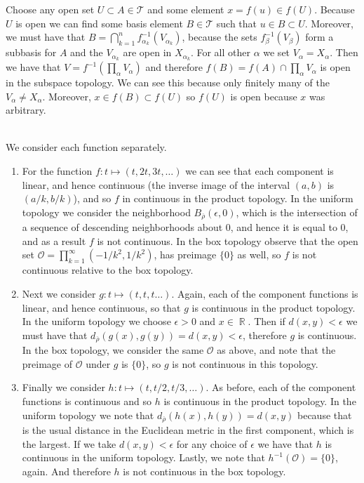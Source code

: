 \documentclass{article}
\DeclareMathOperator{\R}{\mathbb{R}}
\newcommand{\problem}[1]{\noindent{\textbf{Problem #1}}\\}
\newcommand{\problempart}[1]{\noindent{\textbf{(#1)}}}
\begin{document}
\problempart{d} Choose any open set $U \subset A \in \mathcal{T}$ and some element $x = f(u) \in f(U)$. Because $U$ is open we can find some basis element $B \in \mathcal{T}$ such that $u \in B \subset U$. Moreover, we must have that $B = \bigcap_{k=1}^n f^{-1}_{\alpha_k}(V_{\alpha_k})$, because the sets $f^{-1}_\beta(V_\beta)$ form a subbasis for $A$ and the $V_{\alpha_k}$ are open in $X_{\alpha_k}$. For all other $\alpha$ we set $V_\alpha = X_\alpha$. Then we have that $V = f^{-1}(\prod_\alpha V_\alpha)$ and therefore $f(B) = f(A) \cap \prod_\alpha V_\alpha$ is open in the subspace topology. We can see this because only finitely many of the $V_\alpha \neq X_\alpha$. Moreover, $x \in f(B) \subset f(U)$ so $f(U)$ is open because $x$ was arbitrary.   

\problem{2.20.4}
\problempart{a} We consider each function separately.
\begin{enumerate}
\item For the function $f: t \mapsto (t,2t,3t,\ldots)$ we can see that each component is linear, and hence continuous (the inverse image of the interval $(a,b)$ is $(a/k, b/k)$), and so $f$ in continuous in the product topology. In the uniform topology we consider the neighborhood $B_{\overline{\rho}}(\epsilon, 0)$, which is the intersection of a sequence of descending neighborhoods about 0, and hence it is equal to $0$, and as a result $f$ is not continuous. In the box topology observe that the open set $\mathcal{O} = \prod_{k=1}^\infty (-1/k^2, 1/k^2)$, has preimage $\{0\}$ as well, so $f$ is not continuous relative to the box topology.
\item Next we consider $g: t \mapsto (t,t,t\ldots)$. Again, each of the component functions is linear, and hence continuous, so that $g$ is continuous in the product topology. In the uniform topology we choose $\epsilon > 0$ and $x \in \R$. Then if $d(x,y) < \epsilon$ we must have that $d_{\overline{\rho}}(g(x), g(y)) = d(x,y) < \epsilon$,  therefore $g$ is continuous. In the box topology, we consider the same $\mathcal{O}$ as above, and note that the preimage of $\mathcal{O}$ under $g$ is $\{0\}$, so $g$ is not continuous in this topology. 
\item Finally we consider $h: t\mapsto (t, t/2, t/3,\ldots)$. As before, each of the component functions is continuous and so $h$ is continuous in the product topology. In the uniform topology we note that $d_{\overline{\rho}}(h(x),h(y)) = d(x,y)$ because that is the usual distance in the Euclidean metric in the first component, which is the largest. If we take $d(x,y) < \epsilon$ for any choice of $\epsilon$ we have that $h$ is continuous in the uniform topology. Lastly, we note that $h^{-1}(\mathcal{O}) = \{0\}$, again. And therefore $h$ is not continuous in the box topology. 
\end{enumerate}
\end{document}
